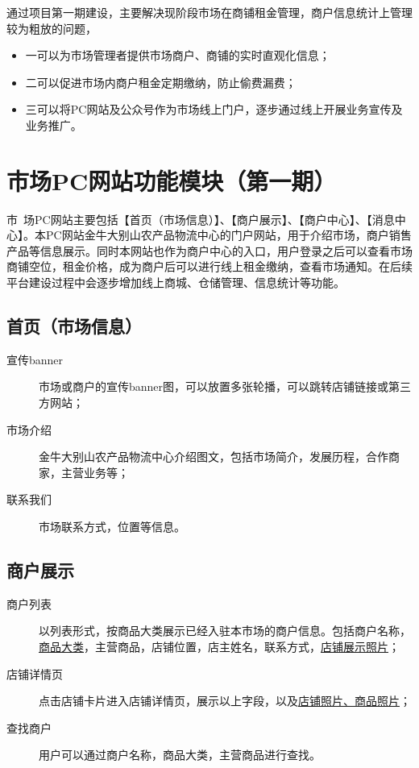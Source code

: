 \documentclass[12pt,a4paper,openany]{ctexrep}
\begin{document}
通过项目第一期建设，主要解决现阶段市场在商铺租金管理，商户信息统计上管理较为粗放的问题，
\begin{itemize}
\item 一可以为市场管理者提供市场商户、商铺的实时直观化信息；
\item 二可以促进市场内商户租金定期缴纳，防止偷费漏费；
\item 三可以将PC网站及公众号作为市场线上门户，逐步通过线上开展业务宣传及业务推广。
\end{itemize}

\chapter{市场PC网站功能模块（第一期）}
\lettrine[lines=2]{市}\, 场PC网站主要包括【首页（市场信息）】、【商户展示】、【商户中心】、【消息中心】。本PC网站金牛大别山农产品物流中心的门户网站，用于介绍市场，商户销售产品等信息展示。同时本网站也作为商户中心的入口，用户登录之后可以查看市场商铺空位，租金价格，成为商户后可以进行线上租金缴纳，查看市场通知。在后续平台建设过程中会逐步增加线上商城、仓储管理、信息统计等功能。\par

\section{首页（市场信息）}
\begin{description}
\item[宣传banner]市场或商户的宣传banner图，可以放置多张轮播，可以跳转店铺链接或第三方网站；
\item[市场介绍]金牛大别山农产品物流中心介绍图文，包括市场简介，发展历程，合作商家，主营业务等；
\item[联系我们]市场联系方式，位置等信息。
\end{description}

\section{商户展示}
\begin{description}
\item[商户列表]以列表形式，按商品大类展示已经入驻本市场的商户信息。包括商户名称，\hyperref[main_business]{商品大类}，主营商品，店铺位置，店主姓名，联系方式，\hyperref[shop_cover]{店铺展示照片}；
\item[店铺详情页]点击店铺卡片进入店铺详情页，展示以上字段，以及\hyperref[shop_cover]{店铺照片、商品照片}；
\item[查找商户]用户可以通过商户名称，商品大类，主营商品进行查找。
\end{description}
\end{document}
